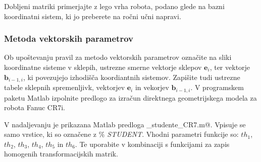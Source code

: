 Dobljeni matriki primerjajte z lego vrha robota, podano glede na bazni koordinatni sistem, ki jo preberete na ročni učni napravi.

\subsubsection{Metoda vektorskih parametrov}

Ob upoštevanju pravil za metodo vektorskih parametrov označite na sliki koordinatne sisteme v sklepih, ustrezne smerne vektorje sklepov $\textbf{e}_i$, ter vektorje $\textbf{b}_{i-1,i}$, 
ki povezujejo izhodišča koordiantnih sistemov. Zapišite tudi ustrezne tabele sklepnih spremenljivk, vektorjev $\textbf{e}_i$ in vekorjev $\textbf{b}_{i-1,i}$. V programskem paketu Matlab izpolnite
predlogo za izračun direktnega geometrijskega modela za robota Fanuc CR7i. 

V nadaljevanju je prikazana Matlab predloga \verb@Za_studente_CR7.m@. Vpisuje se samo vrstice, ki so označene z \emph{$\%$
STUDENT}. Vhodni parametri funkcije so: $th_1$, $th_2$, $th_3$, $th_4$, $th_5$ in $th_6$. Te
uporabite v kombinaciji s funkcijami za zapis homogenih transformacijskih matrik.

